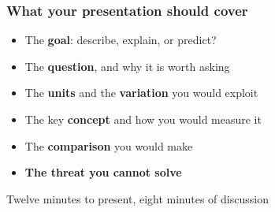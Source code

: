 \begin{frame}
\frametitle{What your presentation should cover}
\centering

\begin{itemize}
  \item The \textbf{goal}: describe, explain, or predict?
  \vspace{4pt}
  \item The \textbf{question}, and why it is worth asking
  \vspace{4pt}
  \item The \textbf{units} and the \textbf{variation} you would exploit
  \vspace{4pt}
  \item The key \textbf{concept} and how you would measure it
  \vspace{4pt}
  \item The \textbf{comparison} you would make
  \vspace{4pt}
  \item \textbf{The threat you cannot solve}
\end{itemize}

\vspace{10pt}
{\small Twelve minutes to present, eight minutes of discussion}

\end{frame}

